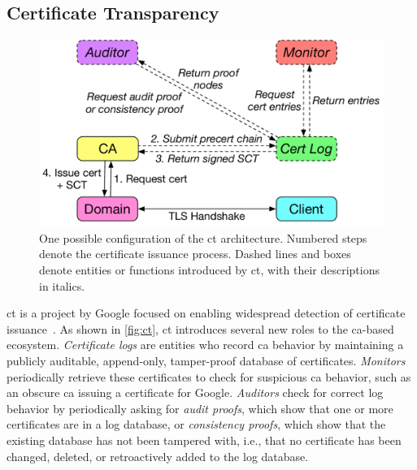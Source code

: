 \subsection{Certificate Transparency}
\label{sec:background:ct}

\begin{figure}
  \centering
  \includegraphics[width=\linewidth]{fig/ct}
  \caption{One possible configuration of the \ac{ct} architecture. Numbered
  steps denote the certificate issuance process. Dashed lines and boxes denote
entities or functions introduced by \ac{ct}, with their descriptions in
italics.}
  \label{fig:ct}
\end{figure}

\acf{ct} is a project by Google focused on enabling widespread detection of
certificate issuance~\cite{rfc6962}. As shown in \autoref{fig:ct}, \ac{ct}
introduces several new roles to the \ac{ca}-based ecosystem. \emph{Certificate
logs} are entities who record \ac{ca} behavior by maintaining a publicly
auditable, append-only, tamper-proof database of certificates. \emph{Monitors}
periodically retrieve these certificates to check for suspicious \ac{ca}
behavior, such as an obscure \ac{ca} issuing a certificate for Google.
\emph{Auditors} check for correct log behavior by periodically asking for
\emph{audit proofs}, which show that one or more certificates are in a log
database, or \emph{consistency proofs}, which show that the existing database
has not been tampered with, i.e., that no certificate has been changed, deleted,
or retroactively added to the log database.

